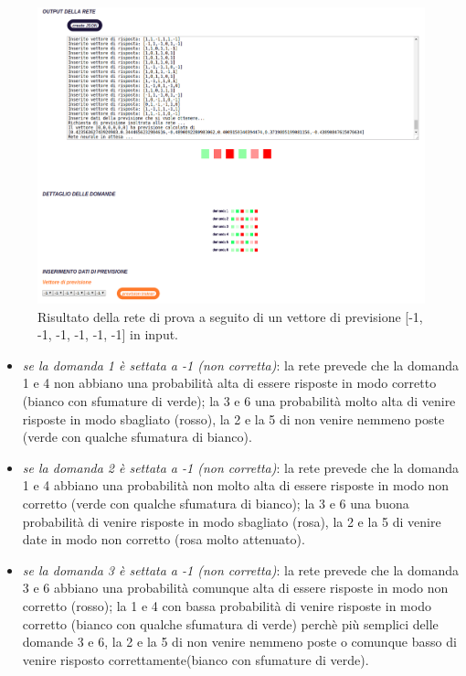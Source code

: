 \begin{itemize}
\begin{figure}[H]
\centering
	\includegraphics[width=0.90\linewidth]{./image/rete_prova-vpmeno1.png}
	\caption{Risultato della rete di prova a seguito di un vettore di previsione [-1, -1, -1, -1, -1, -1] in input.}
	\label{Risultato della rete di prova a seguito di un vettore di previsione [-1, -1, -1, -1, -1, -1] in input.}
\end{figure}
\begin{itemize}
\item \textit{se la domanda 1 \`e settata a -1 (non corretta)}: la rete prevede che la domanda 1 e 4 non abbiano una probabilit\`a alta di essere risposte in modo corretto (bianco con sfumature di verde); la 3 e 6 una probabilit\`a molto alta di venire risposte in modo sbagliato (rosso), la 2 e la 5 di non venire nemmeno poste (verde con qualche sfumatura di bianco).
\item \textit{se la domanda 2 \`e settata a -1 (non corretta)}: la rete prevede che la domanda 1 e 4 abbiano una probabilit\`a non molto alta di essere risposte in modo non corretto (verde con qualche sfumatura di bianco); la 3 e 6 una buona probabilit\`a di venire risposte in modo sbagliato (rosa), la 2 e la 5 di venire date in modo non corretto (rosa molto attenuato).
\item \textit{se la domanda 3 \`e settata a -1 (non corretta)}: la rete prevede che la domanda 3 e 6 abbiano una probabilit\`a comunque alta di essere risposte in modo non corretto (rosso); la 1 e 4 con bassa probabilit\`a di venire risposte in modo corretto (bianco con qualche sfumatura di verde) perch\`e pi\`u semplici delle domande 3 e 6, la 2 e la 5 di non venire nemmeno poste o comunque basso di venire risposto correttamente(bianco con sfumature di verde).

\end{itemize}
\end{itemize}
